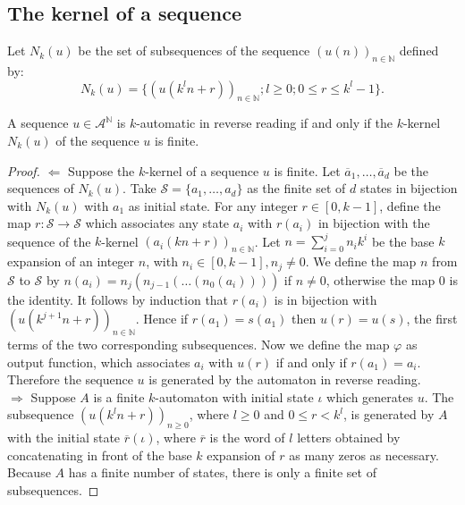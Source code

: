 \documentclass{article}
\begin{document}
\subsection{The kernel of a sequence}
\begin{definition}[$k$-kernel] \label{def:k-kern}
Let $N_k(u)$ be the set of subsequences of the sequence 
$(u(n))_{n \in \mathbb{N}}$ defined by:
\begin{displaymath}
N_k(u) = \{(u(k^ln + r))_{n \in \mathbb{N}}; l \ge 0; 0 \le r \le k^l - 1\}.
\end{displaymath}
\end{definition}

\begin{theorem} \label{thm:revread}
A sequence $u \in \mathcal{A}^\mathbb{N}$ is $k$-automatic in reverse reading 
if and only if the $k$-kernel $N_k(u)$ of the sequence $u$ is finite.
\end{theorem}

\begin{proof}
$\Leftarrow$ Suppose the $k$-kernel of a sequence $u$ is finite. Let
$\overline{a}_1, \ldots, \overline{a}_d$ be the sequences of $N_k(u)$. Take
$\mathcal{S} = \{a_1, \ldots, a_d\}$ as the finite set of $d$ states in 
bijection with $N_k(u)$ with $a_1$ as initial state. For any integer 
$r \in [0, k - 1]$, define the map $r : \mathcal{S} \to \mathcal{S}$ which 
associates any state $a_i$ with $r(a_i)$ in bijection with the sequence of
the $k$-kernel $(a_i(kn + r))_{n \in \mathbb{N}}$. Let 
$n = \sum_{i = 0}^j n_i k^i$ be the 
base $k$ expansion of an integer $n$, with $n_i \in [0, k - 1], n_j \ne 0$.  
We define the map $n$ from
$\mathcal{S}$ to $\mathcal{S}$ by $n(a_i) = n_j(n_{j - 1}( \ldots (n_0(a_i))))$
if $n \ne 0$, otherwise the map 0 is the identity. It follows by induction that
$r(a_i)$ is in bijection with $(u(k^{j + 1} n + r))_{n \in \mathbb{N}}$. 
Hence if $r(a_1) = s(a_1)$ then $u(r) = u(s)$, the first terms of the
two corresponding subsequences. Now we define the map $\varphi$ as output 
function, which associates $a_i$ with $u(r)$ if and only if 
$r(a_1) = a_i$. Therefore the sequence $u$ is generated by the automaton 
in reverse reading.\\
$\Rightarrow$ Suppose $A$ is a finite $k$-automaton with initial state $\iota$
which generates $u$. The subsequence $(u(k^ln + r))_{n \ge 0}$, where
$l \ge 0$ and $0 \le r < k^l$, is generated by $A$ with the initial state
$\overline{r}(\iota)$, where $\overline{r}$ is the word of $l$ letters
obtained by concatenating in front of the base $k$ expansion of $r$ as many
zeros as necessary. Because $A$ has a finite number of states, there is only a
finite set of subsequences. 
\end{proof}
\end{document}

